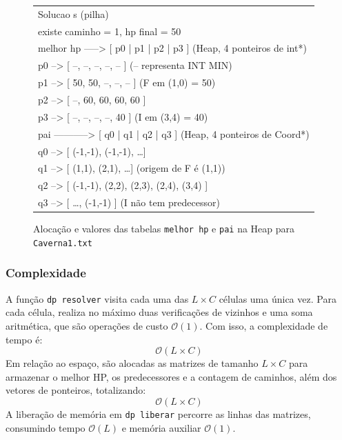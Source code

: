 \documentclass[12pt,a4paper]{article}
\makeatletter
\DeclareRobustCommand{\_}{%
  \ifmmode
    \nfss@text{\textunderscore}%
  \else
    \textunderscore\allowbreak
  \fi
}
\makeatother
\begin{document}
\begin{figure}[htbp]
    \centering
    \begin{minipage}{0.78\textwidth}
        \ttfamily\small
        \begin{tabular}{|l|}
        \hline
        Solucao s (pilha) \\
        \quad existe\_caminho = 1, hp\_final = 50 \\
        \quad melhor\_hp -----> [ p0 | p1 | p2 | p3 ] (Heap, 4 ponteiros de int*) \\
        \quad \quad \quad \quad \quad \quad \quad p0 --> [ --, --, --, --, -- ]  (-- representa INT\_MIN) \\
        \quad \quad \quad \quad \quad \quad \quad p1 --> [ 50, 50, --, --, -- ]  (F em (1,0) = 50) \\
        \quad \quad \quad \quad \quad \quad \quad p2 --> [ --, 60, 60, 60, 60 ] \\
        \quad \quad \quad \quad \quad \quad \quad p3 --> [ --, --, --, --, 40 ]  (I em (3,4) = 40) \\[0.15cm]
        \quad pai -----------> [ q0 | q1 | q2 | q3 ] (Heap, 4 ponteiros de Coord*) \\
        \quad \quad \quad \quad \quad \quad \quad q0 --> [ (-1,-1), (-1,-1), \dots ] \\
        \quad \quad \quad \quad \quad \quad \quad q1 --> [ (1,1), (2,1), \dots ]  (origem de F é (1,1)) \\
        \quad \quad \quad \quad \quad \quad \quad q2 --> [ (-1,-1), (2,2), (2,3), (2,4), (3,4) ] \\
        \quad \quad \quad \quad \quad \quad \quad q3 --> [ \dots, (-1,-1) ]       (I não tem predecessor) \\
        \hline
        \end{tabular}
    \end{minipage}
    \vspace{0.2cm}
    \caption{Alocação e valores das tabelas \texttt{melhor\_hp} e \texttt{pai} na Heap para \texttt{Caverna1.txt}}
    \label{fig:memoria_dp}
\end{figure}

\subsubsection*{Complexidade}

A função \texttt{dp\_resolver} visita cada uma das $L \times C$ células uma única vez. Para cada célula, realiza no máximo duas verificações de vizinhos e uma soma aritmética, que são operações de custo $\mathcal{O}(1)$. Com isso, a complexidade de tempo é:
$$\mathcal{O}(L \times C)$$
Em relação ao espaço, são alocadas as matrizes de tamanho $L \times C$ para armazenar o melhor HP, os predecessores e a contagem de caminhos, além dos vetores de ponteiros, totalizando:
$$\mathcal{O}(L \times C)$$
A liberação de memória em \texttt{dp\_liberar} percorre as linhas das matrizes, consumindo tempo $\mathcal{O}(L)$ e memória auxiliar $\mathcal{O}(1)$.
\end{document}
